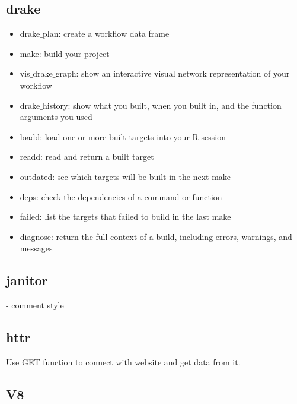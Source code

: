 \subsection{drake}
\begin{itemize}
\item drake$\_$plan: create a workflow data frame
\item make: build your project
\item vis$\_$drake$\_$graph: show an interactive visual network representation of your workflow
\item drake$\_$history: show what you built, when you built in, and the function arguments you used
\item loadd: load one or more built targets into your R session
\item readd: read and return a built target
\item outdated: see which targets will be built in the next make
\item deps: check the dependencies of a command or function
\item failed: list the targets that failed to build in the last make
\item diagnose: return the full context of a build, including errors, warnings, and messages
\end{itemize}

\subsection{janitor}
- comment style
\subsection{httr}
Use GET function to connect with website and get data from it.
\subsection{V8}

